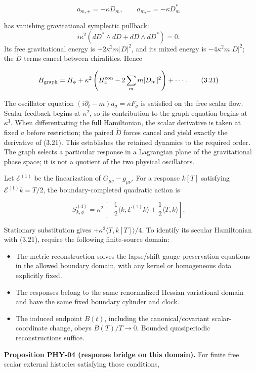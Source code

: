 \documentclass[a4paper,11pt]{article}
\numberwithin{equation}{section}
\providecommand{\tightlist}{\setlength{\itemsep}{0pt}\setlength{\parskip}{0pt}}
\begin{document}
\[
a_{m,+}=-\kappa D_m,\qquad a_{m,-}=-\kappa D_m^*
\tag{3.20}
\]

has vanishing gravitational symplectic pullback: \[
i\kappa^2(dD^*\wedge dD+dD\wedge dD^*)=0 .
\] Its free gravitational energy is \(+2\kappa^2m|D|^2\), and its mixed energy is \(-4\kappa^2m|D|^2\); the \(\dot D\) terms cancel between chiralities. Hence

\[
H_{\rm graph}
=H_\phi+\kappa^2\left(H_4^{\rm con}
-2\sum_m m|D_m|^2\right)+\cdots .
\tag{3.21}
\]

The oscillator equation \((i\partial_t-m)a_\sigma=\kappa F_\sigma\) is satisfied on the free scalar flow. Scalar feedback begins at \(\kappa^2\), so its contribution to the graph equation begins at \(\kappa^3\). When differentiating the full Hamiltonian, the scalar derivative is taken at fixed \(a\) before restriction; the paired \(\dot D\) forces cancel and yield exactly the derivative of (3.21). This establishes the retained dynamics to the required order. The graph selects a particular response in a Lagrangian plane of the gravitational phase space; it is not a quotient of the two physical oscillators.

Let \(\mathcal E^{(1)}\) be the linearization of \(G_{\mu\nu}-g_{\mu\nu}\). For a response \(k[T]\) satisfying \(\mathcal E^{(1)}k=T/2\), the boundary-completed quadratic action is

\[
S^{(4)}_{k,\phi}
=\kappa^2\left[-\frac12\langle k,\mathcal E^{(1)}k\rangle
+\frac12\langle T,k\rangle\right].
\tag{3.22}
\]

Stationary substitution gives \(+\kappa^2\langle T,k[T]\rangle/4\). To identify its secular Hamiltonian with (3.21), require the following finite-source domain:

\begin{itemize}
\tightlist
\item
  The metric reconstruction solves the lapse/shift gauge-preservation equations in the allowed boundary domain, with any kernel or homogeneous data explicitly fixed.
\item
  The responses belong to the same renormalized Hessian variational domain and have the same fixed boundary cylinder and clock.
\item
  The induced endpoint \(B(t)\), including the canonical/covariant scalar-coordinate change, obeys \(B(T)/T\to0\). Bounded quasiperiodic reconstructions suffice.
\end{itemize}

\textbf{Proposition PHY-04 (response bridge on this domain).} For finite free scalar external histories satisfying those conditions,
\end{document}
